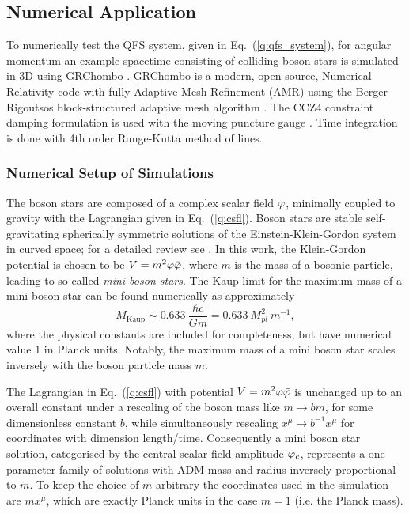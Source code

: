 \subsection{Numerical Application} \label{q:sect:results}
To numerically test the QFS system, given in Eq.~(\ref{q:qfs_system}), for angular momentum an example spacetime consisting of colliding boson stars is simulated in 3D using {\sc GRChombo} \cite{clough2015grchombo} \cite{Andrade2021}. {\sc GRChombo} is a modern, open source, Numerical Relativity code with fully Adaptive Mesh Refinement (AMR) using the Berger-Rigoutsos block-structured adaptive
mesh algorithm \cite{PhysRevD.67.104005}. The CCZ4 constraint damping formulation \cite{PhysRevD.67.104005,PhysRevD.85.064040} is used with the moving puncture gauge \cite{PhysRevLett.96.111101,PhysRevLett.96.111102}. Time integration is done with 4th order Runge-Kutta method of lines. 




\subsubsection{Numerical Setup of Simulations}

The boson stars are composed of a complex scalar field $\varphi$, minimally coupled to gravity with the Lagrangian given in Eq.~(\ref{q:csfl}). Boson stars are stable self-gravitating spherically symmetric solutions of the Einstein-Klein-Gordon system in curved space; for a detailed review see \cite{liebling2017dynamical}. In this work, the Klein-Gordon potential is chosen to be $V=m^2 \varphi \bar{\varphi}$, where $m$ is the mass of a bosonic particle, leading to so called {\it mini boson stars}. The Kaup limit for the maximum mass of a mini boson star can be found numerically as approximately 
\begin{equation} M_{\mathrm{Kaup}} \sim 0.633 ~\frac{\hbar c}{G m} = 0.633 ~M_{pl}^2 ~m^{-1}, \end{equation}
where the physical constants are included for completeness, but have numerical value $1$ in Planck units. Notably, the maximum mass of a mini boson star scales inversely with the boson particle mass $m$. 

The Lagrangian in Eq.~(\ref{q:csfl}) with potential $V=m^2 \varphi \bar{\varphi}$ is unchanged up to an overall constant under a rescaling of the boson mass like $m \rightarrow b m$, for some dimensionless constant $b$, while simultaneously rescaling $x^\mu \rightarrow b^{-1} x^\mu$ for coordinates with dimension length/time. Consequently a mini boson star solution, categorised by the central scalar field amplitude $\varphi_c$, represents a one parameter family of solutions with ADM mass and radius inversely proportional to $m$. To keep the choice of $m$ arbitrary the coordinates used in the simulation are $m x^\mu$, which are exactly Planck units in the case $m=1$ (i.e. the Planck mass).


